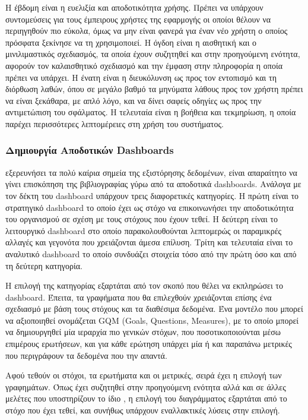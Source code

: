 \documentclass[greek, 12pt]{article}
\begin{document}
Η έβδομη είναι η ευελιξία και αποδοτικότητα χρήσης. Πρέπει να υπάρχουν συντομεύσεις για τους έμπειρους χρήστες της εφαρμογής οι οποίοι θέλουν να περιηγηθούν πιο εύκολα, όμως να μην είναι φανερά για έναν νέο χρήστη ο οποίος πρόσφατα ξεκίνησε να τη χρησιμοποιεί. Η όγδοη είναι η αισθητική και ο μινιλιμαστικός σχεδιασμός, τα οποία έχουν συζητηθεί και στην προηγούμενη ενότητα, αφορούν τον καλαισθητικό σχεδιασμό και την έμφαση στην πληροφορία η οποία πρέπει να υπάρχει.
Η ένατη είναι η διευκόλυνση ως προς τον εντοπισμό και τη διόρθωση λαθών, όπου σε μεγάλο βαθμό τα μηνύματα λάθους προς τον χρήστη πρέπει να είναι ξεκάθαρα, με απλό λόγο, και να δίνει σαφείς οδηγίες ως προς την αντιμετώπιση του σφάλματος. Η τελευταία είναι η βοήθεια και τεκμηρίωση, η οποία παρέχει περισσότερες λεπτομέρειες στη χρήση του συστήματος.

\subsubsection{Δημιουργία Αποδοτικών Dashboards}

 εξερευνήσει τα πολύ καίρια σημεία της εξιστόρησης δεδομένων, είναι απαραίτητο να γίνει επισκόπηση της βιβλιογραφίας γύρω από τα αποδοτικά dashboards. Ανάλογα με τον δέκτη του dashboard υπάρχουν τρεις διαφορετικές κατηγορίες. Η πρώτη είναι το στρατηγικό dashboard το οποίο έχει ως στόχο να επικοινωνήσει την αποδοτικότητα του οργανισμού σε σχέση με τους στόχους που έχουν τεθεί. Η δεύτερη είναι το λειτουργικό dashboard στο οποίο παρακολουθούνται λεπτομερώς οι παραμικρές αλλαγές και γεγονότα που χρειάζονται άμεσα επίλυση. Τρίτη και τελευταία είναι το αναλυτικό dashboard το οποίο συνδυάζει στοιχεία τόσο από την πρώτη όσο και από τη δεύτερη κατηγορία. \cite{pappas2011riding}

Η επιλογή της κατηγορίας εξαρτάται από τον σκοπό που θέλει να εκπληρώσει το dashboard. Έπειτα, τα γραφήματα που θα επιλεχθούν χρειάζονται επίσης ένα σχεδιασμό με βάση τους στόχους και τα διαθέσιμα δεδομένα. Ένα μοντέλο που μπορεί να αξιοποιηθεί ονομάζεται GQM (Goals, Questions, Measures), με το οποίο μπορεί να δημιουργηθεί μία ιεραρχία πιο γενικών στόχων, που ποσοτικοποιούνται μέσω επιμέρους ερωτήσεων, και για κάθε ερώτηση υπάρχει μία ή και παραπάνω μετρικές που περιγράφουν τα δεδομένα που την απαντά. \cite{janes2013effective}

Αφού τεθούν οι στόχοι, τα ερωτήματα και οι μετρικές, σειρά έχει η επιλογή των γραφημάτων. Όπως έχει συζητηθεί στην προηγούμενη ενότητα αλλά και σε άλλες μελέτες που υποστηρίζουν το ίδιο \cite{knaflic2015storytelling, pappas2011riding}, η επιλογή του διαγράμματος εξαρτάται από το στόχο που έχει τεθεί, και συνήθως υπάρχουν εναλλακτικές λύσεις στην επιλογή.
\end{document}
